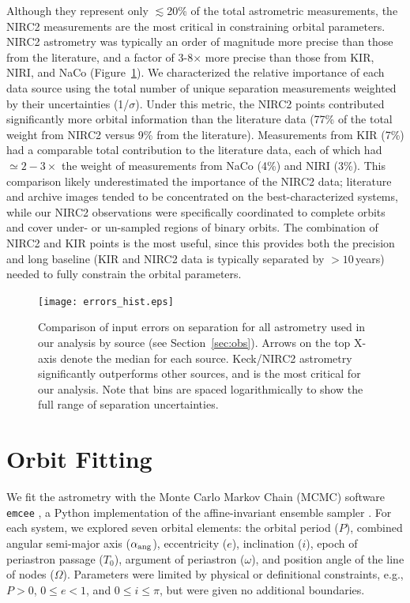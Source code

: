 \documentclass[twocolumn]{aastex62}
\begin{document}
Although they represent only $\lesssim$20\% of the total astrometric measurements, the NIRC2 measurements are the most critical in constraining orbital parameters. NIRC2 astrometry was typically an order of magnitude more precise than those from the literature, and a factor of 3-8$\times$ more precise than those from KIR, NIRI, and NaCo (Figure~\ref{fig:errors}). We characterized the relative importance of each data source using the total number of unique separation measurements weighted by their uncertainties (1/$\sigma$). Under this metric, the NIRC2 points contributed significantly more orbital information than the literature data (77\% of the total weight from NIRC2 versus 9\% from the literature). Measurements from KIR (7\%) had a comparable total contribution to the literature data, each of which had $\simeq2-3\times$ the weight of measurements from NaCo (4\%) and NIRI (3\%). This comparison likely underestimated the importance of the NIRC2 data; literature and archive images tended to be concentrated on the best-characterized systems, while our NIRC2 observations were specifically coordinated to complete orbits and cover under- or un-sampled regions of binary orbits. The combination of NIRC2 and KIR points is the most useful, since this provides both the precision and long baseline (KIR and NIRC2 data is typically separated by $>10$\,years) needed to fully constrain the orbital parameters.

\begin{figure}[htb]
\begin{center}
\texttt{[image: errors\_hist.eps]}
\caption{Comparison of input errors on separation for all astrometry used in our analysis by source (see Section~\ref{sec:obs}). Arrows on the top X-axis denote the median for each source. Keck/NIRC2 astrometry significantly outperforms other sources, and is the most critical for our analysis. Note that bins are spaced logarithmically to show the full range of separation uncertainties. }
\label{fig:errors}
\end{center}
\end{figure}


\section{Orbit Fitting}\label{sec:orbit}

We fit the astrometry with the Monte Carlo Markov Chain (MCMC) software {\tt emcee} \citep{Foreman-Mackey2013}, a Python implementation of the affine-invariant ensemble sampler \citep{goodman2010}. For each system, we explored seven orbital elements: the orbital period ($P$), combined angular semi-major axis ($\alpha_{\rm{ang}}$), eccentricity ($e$), inclination ($i$), epoch of periastron passage ($T_0$), argument of periastron ($\omega$), and position angle of the line of nodes ($\Omega$). Parameters were limited by physical or definitional constraints, e.g., $P>0$, $0 \le e<1$, and $0\le i \le \pi$, but were given no additional boundaries. 
\end{document}
